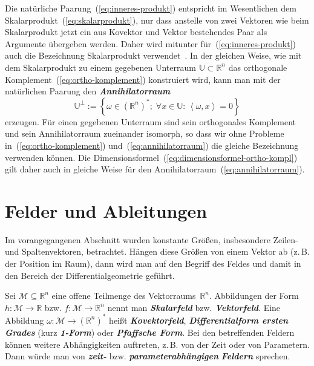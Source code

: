 Die natürliche Paarung~(\ref{eq:inneres-produkt}) entspricht im
Wesentlichen dem Skalarprodukt~(\ref{eq:skalarprodukt}), nur dass
anstelle von zwei Vektoren wie beim Skalarprodukt jetzt ein aus Kovektor
und Vektor bestehendes Paar als Argumente übergeben werden. Daher
wird mitunter für~(\ref{eq:inneres-produkt}) auch die Bezeichnung
Skalarprodukt verwendet~\cite{bishop1980}. In der gleichen Weise,
wie mit dem Skalarprodukt zu einem gegebenen Unterraum $\mathbb{U}\subset{\mathbb{R}}^{n}$
das orthogonale Komplement~(\ref{eq:ortho-komplement}) konstruiert
wird, kann man mit der natürlichen Paarung den \textbf{\em Annihilatorraum}
\begin{equation}
\mathbb{U}^{\perp}:=\left\{ \omega\in({\mathbb{R}}^{n})^{*};\;\forall x\in\mathbb{U}:\,\left\langle \omega,x\right\rangle =0\right\} \label{eq:annihilatorraum}
\end{equation}
erzeugen. Für einen gegebenen Unterraum sind sein orthogonales Komplement
und sein Annihilatorraum zueinander isomorph, so dass wir ohne Probleme
in~(\ref{eq:ortho-komplement}) und~(\ref{eq:annihilatorraum})
die gleiche Bezeichnung verwenden können. Die Dimensionsformel~(\ref{eq:dimensionsformel-ortho-kompl})
gilt daher auch in gleiche Weise für den Annihilatorraum~(\ref{eq:annihilatorraum}).

\section{Felder und Ableitungen\label{sec:Felder-und-Ableitungen}}

Im vorangegangenen Abschnitt wurden konstante Größen, insbesondere
Zeilen- und Spaltenvektoren, betrachtet. Hängen diese Größen von einem
Vektor ab (z.\,B. der Position im Raum), dann wird man auf den Begriff
des Feldes und damit in den Bereich der Differentialgeometrie geführt.

Sei $\mathcal{M}\subseteq{\mathbb{R}}^{n}$ eine offene Teilmenge des Vektorraums~${\mathbb{R}}^{n}$.
Abbildungen der Form $h:\mathcal{M}\to{\mathbb{R}}$ bzw. $f:\mathcal{M}\to{\mathbb{R}}^{n}$
nennt man \textbf{\em Skalarfeld} bzw. \textbf{\em Vektorfeld}.
Eine Abbildung $\omega:\mathcal{M}\to({\mathbb{R}}^{n})^{*}$ heißt \textbf{\em Kovektorfeld},
\textbf{\em Differentialform ersten Grades}
(kurz \textbf{\em 1-Form}) oder \textbf{\em Pfaffsche Form}. Bei den betreffenden
Feldern können weitere Abhängigkeiten auftreten, z.\,B. von der Zeit
oder von Parametern. Dann würde man von \textbf{\em zeit-} bzw. \textbf{\em parameterabhängigen}
\textbf{\em Feldern} sprechen.

